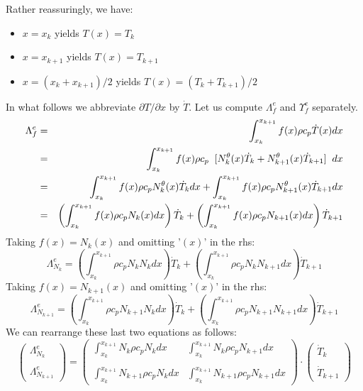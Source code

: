 Rather reassuringly, we have:
\begin{itemize}
\item $x=x_k$ yields $T(x)=T_k$
\item $x=x_{k+1}$ yields $T(x)=T_{k+1}$
\item $x=(x_k+x_{k+1})/2$ yields $T(x)=(T_k+T_{k+1})/2$
\end{itemize}
In what follows we abbreviate $\partial T/\partial x$ by $\dot{T}$.
Let us compute ${\Lambda}_f^e$ and ${\Upsilon}_f^e$ separately.
\begin{eqnarray}
{\Lambda}_f^e 
&=&\int_{x_k}^{x_{k+1}} f(x) \rho c_p \dot T(x) dx \nonumber\\
&=& \int_{x_k}^{x_{k+1}} f(x) \rho c_p \;\;  [ N_{k}^\theta(x) \dot{T}_k + N_{k+1}^\theta(x) \dot{T}_{k+1} ] \;\; dx  \nonumber\\
&=& \int_{x_k}^{x_{k+1}} f(x) \rho c_p N_{k}^\theta(x) \dot{T}_k  dx  
+ \int_{x_k}^{x_{k+1}} f(x) \rho c_p N_{k+1}^\theta(x) \dot{T}_{k+1}   dx \nonumber\\
&=&  \left( \int_{x_k}^{x_{k+1}} f(x) \rho c_p  N_{k}(x) dx \right) \dot{T}_k  
+ \left( \int_{x_k}^{x_{k+1}} f(x) \rho c_p N_{k+1}(x) dx \right)  \dot{T}_{k+1}  \nonumber
\end{eqnarray}
Taking $f(x)=N_k(x)$ and omitting '$(x)$' in the rhs:
\[
{\Lambda}_{N_k}^e=
\left( \int_{x_k}^{x_{k+1}} \rho c_p  N_k N_{k} dx \right) \dot{T}_k  
+ \left( \int_{x_k}^{x_{k+1}} \rho c_p N_k N_{k+1} dx \right)  \dot{T}_{k+1} 
\]
Taking $f(x)=N_{k+1}(x)$ and omitting '$(x)$' in the rhs:
\[
{\Lambda}_{N_{k+1}}^e
=  \left( \int_{x_k}^{x_{k+1}} \rho c_p N_{k+1} N_{k} dx \right) \dot{T}_k  
+ \left( \int_{x_k}^{x_{k+1}}  \rho c_p  N_{k+1} N_{k+1} dx \right)  \dot{T}_{k+1} 
\]
We can rearrange these last two equations as follows:
\[
\left(
\begin{array}{c}
{\Lambda}_{N_k}^e  \\ \\ {\Lambda}_{N_{k+1}}^e
\end{array}
\right)
=
\left(
\begin{array}{cc}
\int_{x_k}^{x_{k+1}} N_k     \rho c_p N_{k} dx  &  \int_{x_k}^{x_{k+1}} N_k  \rho c_p N_{k+1} dx \\ \\
\int_{x_k}^{x_{k+1}} N_{k+1} \rho c_p N_{k} dx  &  \int_{x_k}^{x_{k+1}} N_{k+1} \rho c_p N_{k+1} dx 
\end{array}
\right)
\cdot
\left(
\begin{array}{c}
\dot{T}_k \\ \\
\dot{T}_{k+1}
\end{array}
\right)
\]
